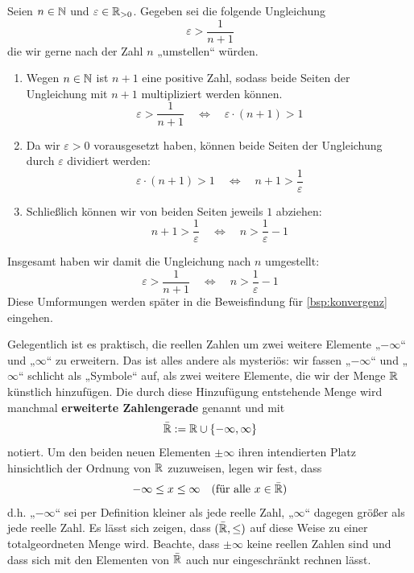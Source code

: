 \begin{bsp}
    Seien $n\in \mathbb N$ und $\varepsilon \in \mathbb R_{>0}$. Gegeben sei die folgende Ungleichung
        \[ \varepsilon > \frac{1}{n+1} \]
    die wir gerne nach der Zahl $n$ „umstellen“ würden.
    \begin{enumerate}
        \item Wegen $n\in \mathbb N$ ist $n+1$ eine positive Zahl, sodass beide Seiten der Ungleichung mit $n+1$ multipliziert werden können.
            \[ \varepsilon  > \frac{1}{n+1} \quad\iff\quad \varepsilon \cdot (n+1) > 1\]
        \item Da wir $\varepsilon>0$ vorausgesetzt haben, können beide Seiten der Ungleichung durch $\varepsilon$ dividiert werden:
            \[ \varepsilon \cdot (n+1) > 1 \quad\iff\quad n+1 > \frac{1}{\varepsilon} \]
        \item Schließlich können wir von beiden Seiten jeweils $1$ abziehen:
            \[ n+1 > \frac{1}{\varepsilon} \quad\iff\quad n > \frac{1}{\varepsilon}-1 \]
    \end{enumerate}
    Insgesamt haben wir damit die Ungleichung nach $n$ umgestellt:
        \[ \varepsilon > \frac{1}{n+1} \quad\iff\quad n > \frac{1}{\varepsilon}-1 \]
    Diese Umformungen werden später in die Beweisfindung für \cref{bsp:konvergenz} eingehen.
\end{bsp}


\begin{de} 
    Gelegentlich ist es praktisch, die reellen Zahlen um zwei weitere Elemente „$-\infty$“ und „$\infty$“ zu erweitern. Das ist alles andere als mysteriös: wir fassen „$-\infty$“ und „$\infty$“ schlicht als „Symbole“ auf, als zwei weitere Elemente, die wir der Menge $\mathbb R$ künstlich hinzufügen. Die durch diese Hinzufügung entstehende Menge wird manchmal \textbf{erweiterte Zahlengerade} genannt und mit
        \[ \bar{\mathbb R} := \mathbb R\cup \{-\infty,\infty\} \]
    notiert. Um den beiden neuen Elementen $\pm \infty$ ihren intendierten Platz hinsichtlich der Ordnung von $\mathbb R$ zuzuweisen, legen wir fest, dass
        \begin{align*}
            -\infty \le  x \le \infty && (\text{für alle $x\in \bar {\mathbb R}$})
        \end{align*}
    d.h. „$-\infty$“ sei per Definition kleiner als jede reelle Zahl, „$\infty$“ dagegen größer als jede reelle Zahl. Es lässt sich zeigen, dass $(\bar {\mathbb R},\le)$ auf diese Weise zu einer totalgeordneten Menge wird. Beachte, dass $\pm \infty$ keine reellen Zahlen sind und dass sich mit den Elementen von $\bar{\mathbb R}$ auch nur eingeschränkt rechnen lässt.
\end{de}


